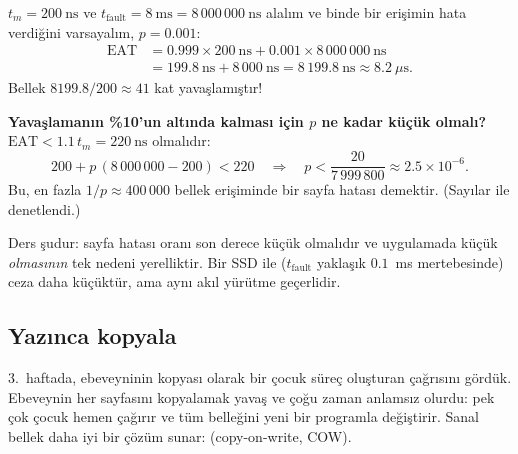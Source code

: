 \begin{example}
$t_m = 200\ \text{ns}$ ve $t_{\text{fault}} = 8\ \text{ms} = 8\,000\,000\ \text{ns}$ alalım ve binde bir erişimin hata verdiğini varsayalım, $p = 0.001$:
\begin{align*}
\text{EAT} &= 0.999 \times 200\ \text{ns} + 0.001 \times 8\,000\,000\ \text{ns} \\
           &= 199.8\ \text{ns} + 8\,000\ \text{ns} = 8\,199.8\ \text{ns} \approx 8.2\ \mu\text{s}.
\end{align*}
Bellek $8199.8/200 \approx 41$ kat yavaşlamıştır!

\textbf{Yavaşlamanın \%10'un altında kalması için $p$ ne kadar küçük olmalı?} $\text{EAT} < 1.1\, t_m = 220\ \text{ns}$ olmalıdır:
\[
200 + p\,(8\,000\,000 - 200) < 220
\quad\Longrightarrow\quad
p < \frac{20}{7\,999\,800} \approx 2.5 \times 10^{-6}.
\]
Bu, en fazla $1/p \approx 400\,000$ bellek erişiminde bir sayfa hatası demektir. (Sayılar  ile denetlendi.)
\end{example}

Ders şudur: sayfa hatası oranı son derece küçük olmalıdır ve uygulamada küçük \emph{olmasının} tek nedeni yerelliktir. Bir SSD ile ($t_{\text{fault}}$ yaklaşık $0.1$~ms mertebesinde) ceza daha küçüktür, ama aynı akıl yürütme geçerlidir.

\subsection{Yazınca kopyala}
\label{sec:cow}

3.\ haftada, ebeveyninin kopyası olarak bir çocuk süreç oluşturan  çağrısını gördük. Ebeveynin her sayfasını kopyalamak yavaş ve çoğu zaman anlamsız olurdu: pek çok çocuk hemen  çağırır ve tüm belleğini yeni bir programla değiştirir. Sanal bellek daha iyi bir çözüm sunar:  (copy-on-write, COW).

